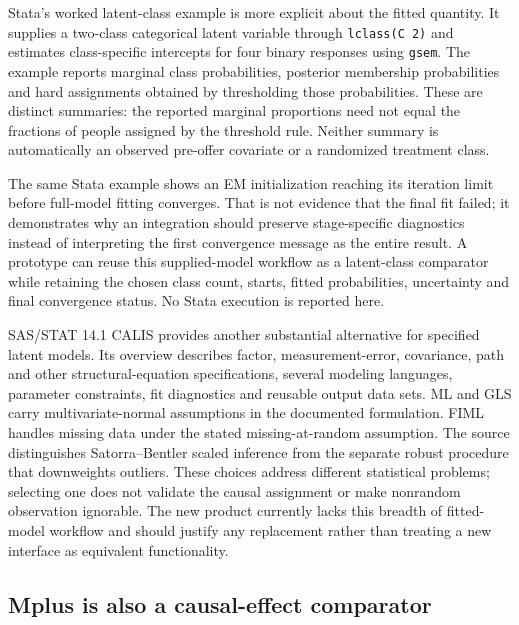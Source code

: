 Stata's worked latent-class example is more explicit about the fitted
quantity. It supplies a two-class categorical latent variable through
\texttt{lclass(C 2)} and estimates class-specific intercepts for four
binary responses using \texttt{gsem}. The example reports marginal class
probabilities, posterior membership probabilities and hard assignments
obtained by thresholding those probabilities. These are distinct
summaries: the reported marginal proportions need not equal the
fractions of people assigned by the threshold rule. Neither summary is
automatically an observed pre-offer covariate or a randomized treatment
class. \citep[pp.2--6]{exec13_latent_stata_lca}

The same Stata example shows an EM initialization reaching its iteration
limit before full-model fitting converges. That is not evidence that the
final fit failed; it demonstrates why an integration should preserve
stage-specific diagnostics instead of interpreting the first convergence
message as the entire result. A prototype can reuse this supplied-model
workflow as a latent-class comparator while retaining the chosen class
count, starts, fitted probabilities, uncertainty and final convergence
status. No Stata execution is reported here.
\citep[pp.3--5]{exec13_latent_stata_lca}

SAS/STAT 14.1 CALIS provides another substantial alternative for
specified latent models. Its overview describes factor,
measurement-error, covariance, path and other structural-equation
specifications, several modeling languages, parameter constraints, fit
diagnostics and reusable output data sets. ML and GLS carry
multivariate-normal assumptions in the documented formulation. FIML
handles missing data under the stated missing-at-random assumption. The
source distinguishes Satorra--Bentler scaled inference from the separate
robust procedure that downweights outliers. These choices address
different statistical problems; selecting one does not validate the
causal assignment or make nonrandom observation ignorable. The new
product currently lacks this breadth of fitted-model workflow and should
justify any replacement rather than treating a new interface as
equivalent functionality. \citep{exec13_latent_sas_calis}

\hypertarget{mplus-is-also-a-causal-effect-comparator}{%
\subsection{Mplus is also a causal-effect
comparator}\label{mplus-is-also-a-causal-effect-comparator}}

